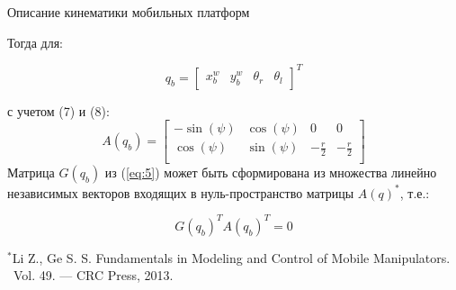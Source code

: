 \documentclass[newPxFont,numfooter,sectionpages]{beamer}
\begin{document}
\begin{frame}{Описание кинематики мобильных платформ}

	\begin{center}
		\begin{minipage}[b]{0.9\textwidth}
			Тогда для:
	
			\begin{equation}
				q_b = 
				\begin{bmatrix}
				x^w_b & y^w_b & \theta_r & \theta_l
				\end{bmatrix}^T
				\tag{9} \label{eq:9}
			\end{equation}

			\noindent
			с учетом (7) и (8):
			\begin{equation}
			A(q_b) = 
			\begin{bmatrix}
			-\sin(\psi) & \cos(\psi) & 0 & 0\\[1mm]
			\cos(\psi) & \sin(\psi) & -\frac{r}{2} & -\frac{r}{2}\\[1mm]
			\end{bmatrix}
			\tag{10} \label{eq:10}
			\end{equation}
			Матрица $G(q_b)$ из (\ref{eq:5}) может быть сформирована из множества линейно независимых векторов входящих в нуль-пространство матрицы $A(q)^*$, т.е.:
			
			\begin{equation}
				G(q_b)^T A(q_b)^T = 0
				\tag{11} \label{eq:11}
			\end{equation}
			
		\end{minipage}
	\end{center}
	
	\tiny{$^*$Li Z., Ge S. S. Fundamentals in Modeling and Control of Mobile Manipulators.\\ \ Vol. 49. —
CRC Press, 2013.\\ \ }
\end{frame}
\end{document}
